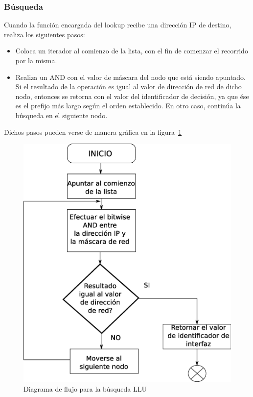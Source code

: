 \subsubsection{Búsqueda}

Cuando la función encargada del lookup recibe una dirección IP de destino, realiza los siguientes pasos:

\begin{itemize}
	\item Coloca un iterador al comienzo de la lista, con el fin de comenzar el recorrido por la misma.
	\item Realiza un AND con el valor de máscara del nodo que está siendo apuntado. Si el resultado de la operación es igual al valor de dirección de red de dicho nodo, entonces se retorna con el valor del identificador de decisión, ya que ése es el prefijo más largo según el orden establecido. En otro caso, continúa la búsqueda en el siguiente nodo.
\end{itemize}

Dichos pasos pueden verse de manera gráfica en la figura~\ref{fig:llusearch}

\begin{figure}[H]
  \centering
	\includegraphics[scale=0.4]{4-implementacion/graf/llusearch.eps}
  \caption{Diagrama de flujo para la búsqueda LLU}
  \label{fig:llusearch}
\end{figure}

